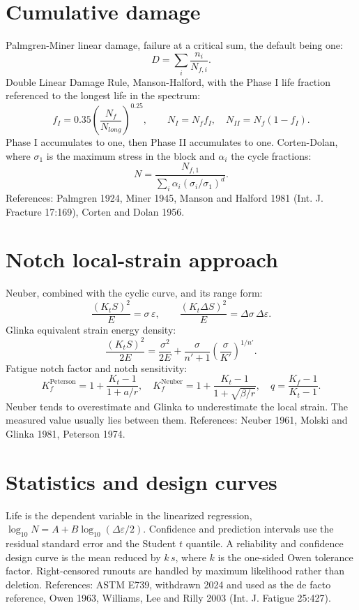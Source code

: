\documentclass[11pt]{article}
\begin{document}
\section{Cumulative damage}
Palmgren-Miner linear damage, failure at a critical sum, the default being one:
\begin{equation}
D = \sum_i \frac{n_i}{N_{f,i}}.
\end{equation}
Double Linear Damage Rule, Manson-Halford, with the Phase I life fraction
referenced to the longest life in the spectrum:
\begin{equation}
f_I = 0.35\left(\frac{N_f}{N_{long}}\right)^{0.25},
\qquad N_I = N_f f_I, \quad N_{II} = N_f(1-f_I).
\end{equation}
Phase I accumulates to one, then Phase II accumulates to one. Corten-Dolan, where
\(\sigma_1\) is the maximum stress in the block and \(\alpha_i\) the cycle fractions:
\begin{equation}
N = \frac{N_{f,1}}{\sum_i \alpha_i (\sigma_i/\sigma_1)^{d}}.
\end{equation}
References: Palmgren 1924, Miner 1945, Manson and Halford 1981 (Int. J. Fracture
17:169), Corten and Dolan 1956.

\section{Notch local-strain approach}
Neuber, combined with the cyclic curve, and its range form:
\begin{equation}
\frac{(K_t S)^2}{E} = \sigma\,\varepsilon,
\qquad
\frac{(K_t \Delta S)^2}{E} = \Delta\sigma\,\Delta\varepsilon.
\end{equation}
Glinka equivalent strain energy density:
\begin{equation}
\frac{(K_t S)^2}{2E} = \frac{\sigma^2}{2E} + \frac{\sigma}{n'+1}\left(\frac{\sigma}{K'}\right)^{1/n'}.
\end{equation}
Fatigue notch factor and notch sensitivity:
\begin{equation}
K_f^{\text{Peterson}} = 1 + \frac{K_t-1}{1+a/r},
\quad
K_f^{\text{Neuber}} = 1 + \frac{K_t-1}{1+\sqrt{\beta/r}},
\quad
q = \frac{K_f-1}{K_t-1}.
\end{equation}
Neuber tends to overestimate and Glinka to underestimate the local strain. The
measured value usually lies between them. References: Neuber 1961, Molski and
Glinka 1981, Peterson 1974.

\section{Statistics and design curves}
Life is the dependent variable in the linearized regression,
\(\log_{10} N = A + B \log_{10}(\Delta\varepsilon/2)\). Confidence and prediction
intervals use the residual standard error and the Student \(t\) quantile. A
reliability and confidence design curve is the mean reduced by \(k\,s\), where
\(k\) is the one-sided Owen tolerance factor. Right-censored runouts are handled
by maximum likelihood rather than deletion. References: ASTM E739, withdrawn 2024
and used as the de facto reference, Owen 1963, Williams, Lee and Rilly 2003 (Int.
J. Fatigue 25:427).
\end{document}
